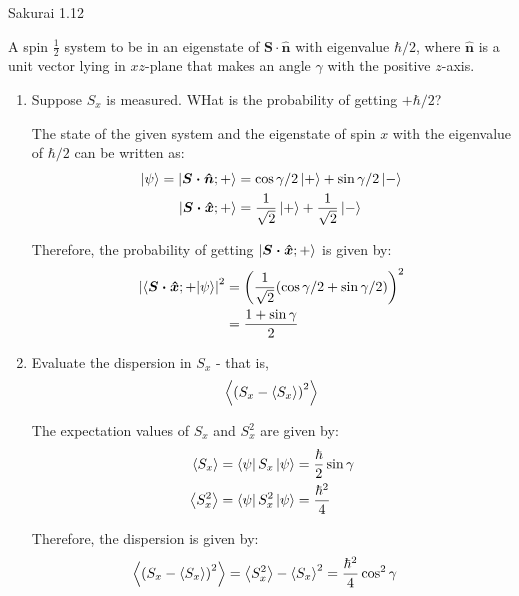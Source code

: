 \documentclass{article}
\begin{document}
	\newpage
	\begin{section}{Sakurai 1.12}
		\newcommand{\nbold}{\boldsymbol{\hat{n}}}
		\newcommand{\sdotn}{\boldsymbol{S \cdot \hat{n}}}
		\newcommand{\sdotnplus}{\ket{\sdotn; +}}
		\newcommand{\sdotnminus}{\ket{\sdotn; -}}

		A spin $\frac{1}{2}$ system to be in an eigenstate of $\sdotn$ with eigenvalue $\hbar/2$, where $\nbold$ is a unit vector lying in $xz$-plane that makes an angle $\gamma$ with the positive $z$-axis.

		\begin{enumerate}
			\item Suppose $S_x$ is measured. WHat is the probability of getting $+\hbar/2$?
			
			\begin{tcolorbox}[breakable]
				The state of the given system and the eigenstate of spin $x$ with the eigenvalue of $\hbar/2$ can be written as:
				\begin{align*}
					\ket{\psi} = \ket{\boldsymbol{S \cdot \hat{n}}; +} &= \cos{\gamma / 2} \ket{+} + \sin{\gamma / 2} \ket{-} \\
					\ket{\boldsymbol{S \cdot \hat{x}}; +} &= \frac{1}{\sqrt{2}} \ket{+} + \frac{1}{\sqrt{2}} \ket{-}
				\end{align*}

				Therefore, the probability of getting $\ket{\boldsymbol{S \cdot \hat{x}}; +}$ is given by:
				\begin{align*}
					\left|\bra{\boldsymbol{S \cdot \hat{x}}; +} \ket{\psi}\right|^2 &= 
						\left(\frac{1}{\sqrt{2}} (\cos{\gamma / 2} + \sin{\gamma / 2})\right)^2 \\
					&= \frac{1+ \sin{\gamma}}{2}
				\end{align*}
			\end{tcolorbox}

			\item Evaluate the dispersion in $S_x$ - that is,
			\newcommand{\expc}[1]{\left<#1\right>}
			\begin{equation*}
				\expc{\pbracket{S_x - \expc{S_x}}^2}
			\end{equation*}

			\begin{tcolorbox}
				The expectation values of $S_x$ and $S_x^2$ are given by:
				\begin{align*}
					\expc{S_x} &= \bra{\psi}{S_x}\ket{\psi} = \frac{\hbar}{2} \sin{\gamma} \\
					\expc{S_x^2} &= \bra{\psi}{S_x^2}\ket{\psi} = \frac{\hbar^2}{4}
				\end{align*}

				Therefore, the dispersion is given by:
				\begin{align*}
					\expc{\pbracket{S_x - \expc{S_x}}^2} = \expc{S_x^2} - \expc{S_x}^2 &= \frac{\hbar^2}{4} \cos^2{\gamma}
				\end{align*}
			\end{tcolorbox}
		\end{enumerate}
	\end{section}
\end{document}
